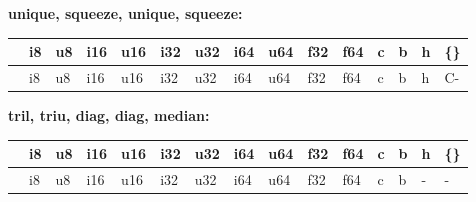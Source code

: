 \textbf{unique, squeeze, unique, squeeze:}
\begin{scriptsize}\begin{tt}\begin{center}\vspace{-.3cm}\begin{tabular}{|m{.65cm}||m{.65cm}|m{.65cm}|m{.65cm}|m{.65cm}|m{.65cm}|m{.65cm}|m{.65cm}|m{.65cm}|m{.65cm}|m{.65cm}|m{.65cm}|m{.65cm}|m{.65cm}|m{.65cm}|}\hline 
&i8&u8&i16&u16&i32&u32&i64&u64&f32&f64&c&b&h&\{\}\\ \hline \hline
&i8&u8&i16&u16&i32&u32&i64&u64&f32&f64&c&b&h&C-\\ \hline
\end{tabular}\end{center}\end{tt}\end{scriptsize} 

\textbf{tril, triu, diag, diag, median:}
\begin{scriptsize}\begin{tt}\begin{center}\vspace{-.3cm}\begin{tabular}{|m{.65cm}||m{.65cm}|m{.65cm}|m{.65cm}|m{.65cm}|m{.65cm}|m{.65cm}|m{.65cm}|m{.65cm}|m{.65cm}|m{.65cm}|m{.65cm}|m{.65cm}|m{.65cm}|m{.65cm}|}\hline 
&i8&u8&i16&u16&i32&u32&i64&u64&f32&f64&c&b&h&\{\}\\ \hline \hline
&i8&u8&i16&u16&i32&u32&i64&u64&f32&f64&c&b&-&-\\ \hline
\end{tabular}\end{center}\end{tt}\end{scriptsize} 

